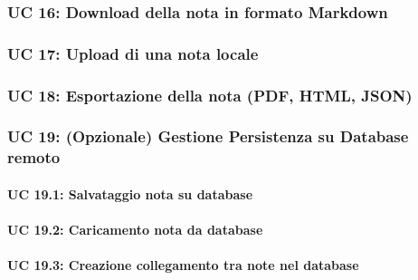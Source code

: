 \subsubsection{UC 16: Download della nota in formato Markdown}

\subsubsection{UC 17: Upload di una nota locale}

\subsubsection{UC 18: Esportazione della nota (PDF, HTML, JSON)}

\subsubsection{UC 19: (Opzionale) Gestione Persistenza su Database remoto}

\paragraph{UC 19.1: Salvataggio nota su database}

\paragraph{UC 19.2: Caricamento nota da database}

\paragraph{UC 19.3: Creazione collegamento tra note nel database}